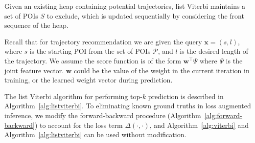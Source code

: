 Given an existing heap containing potential trajectories,
list Viterbi maintains a set of POIs $S$ to exclude, which is updated
sequentially by considering the front sequence of the heap.

Recall that for trajectory recommendation we are given the query $\mathbf{x}=(s, l)$, where
$s$ is the starting POI from the set of POIs $\mathcal{P}$,
and $l$ is the desired length of the trajectory.
We assume the score function is of the form $\mathbf{w}^\top \Psi$ where $\Psi$ is the joint
feature vector. $\mathbf{w}$ could be the value of the weight in the current iteration in training,
or the learned weight vector during prediction.

The list Viterbi algorithm for performing top-$k$ prediction is described in Algorithm~\ref{alg:listviterbi}.
To eliminating known ground truths in loss augmented inference,
we modify the forward-backward procedure (Algorithm~\ref{alg:forward-backward}) to account for the loss term $\Delta(\cdot,\cdot)$,
and Algorithm~\ref{alg:viterbi} and Algorithm~\ref{alg:listviterbi} can be used without modification.

